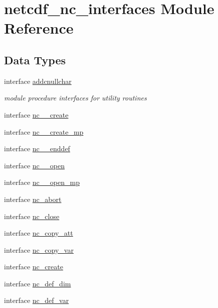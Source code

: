 \hypertarget{namespacenetcdf__nc__interfaces}{}\section{netcdf\+\_\+nc\+\_\+interfaces Module Reference}
\label{namespacenetcdf__nc__interfaces}
\subsection*{Data Types}
\begin{DoxyCompactItemize}
\item 
interface \hyperlink{interfacenetcdf__nc__interfaces_1_1addcnullchar}{addcnullchar}
\begin{DoxyCompactList}\small\item\em module procedure interfaces for utility routines \end{DoxyCompactList}\item 
interface \hyperlink{interfacenetcdf__nc__interfaces_1_1nc____create}{nc\+\_\+\+\_\+create}
\item 
interface \hyperlink{interfacenetcdf__nc__interfaces_1_1nc____create__mp}{nc\+\_\+\+\_\+create\+\_\+mp}
\item 
interface \hyperlink{interfacenetcdf__nc__interfaces_1_1nc____enddef}{nc\+\_\+\+\_\+enddef}
\item 
interface \hyperlink{interfacenetcdf__nc__interfaces_1_1nc____open}{nc\+\_\+\+\_\+open}
\item 
interface \hyperlink{interfacenetcdf__nc__interfaces_1_1nc____open__mp}{nc\+\_\+\+\_\+open\+\_\+mp}
\item 
interface \hyperlink{interfacenetcdf__nc__interfaces_1_1nc__abort}{nc\+\_\+abort}
\item 
interface \hyperlink{interfacenetcdf__nc__interfaces_1_1nc__close}{nc\+\_\+close}
\item 
interface \hyperlink{interfacenetcdf__nc__interfaces_1_1nc__copy__att}{nc\+\_\+copy\+\_\+att}
\item 
interface \hyperlink{interfacenetcdf__nc__interfaces_1_1nc__copy__var}{nc\+\_\+copy\+\_\+var}
\item 
interface \hyperlink{interfacenetcdf__nc__interfaces_1_1nc__create}{nc\+\_\+create}
\item 
interface \hyperlink{interfacenetcdf__nc__interfaces_1_1nc__def__dim}{nc\+\_\+def\+\_\+dim}
\item 
interface \hyperlink{interfacenetcdf__nc__interfaces_1_1nc__def__var}{nc\+\_\+def\+\_\+var}

\end{DoxyCompactItemize}
